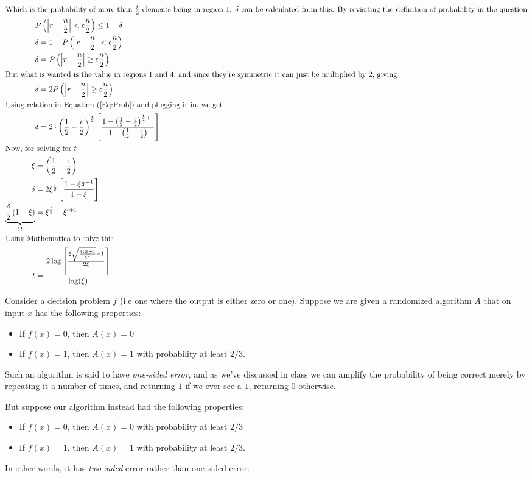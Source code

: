 \documentclass[addpoints]{exam}
\renewcommand{\P}[1]{\left( #1\right)}
\newcommand{\abs}[1]{\left| #1\right|}
\begin{document}
\begin{questions}
\begin{solution}
\begin{align}
\intertext{Which is the probability of more than $\frac{t}{2}$ elements being in region 1. $\delta$ can be calculated from this. By revisiting the definition of probability in the question}
&P\P{\abs{r-\frac{n}{2}} < \epsilon\frac{n}{2}} \leq 1-\delta\\
&\delta = 1 - P\P{\abs{r-\frac{n}{2}} < \epsilon\frac{n}{2}}\\
&\delta = P\P{\abs{r-\frac{n}{2}} \geq \epsilon\frac{n}{2}}\\
\intertext{But what is wanted is the value in regions 1 and 4, and since they're symmetric it can just be multiplied by 2, giving}
&\delta = 2P\P{\abs{r-\frac{n}{2}} \geq \epsilon\frac{n}{2}}\\
\intertext{Using relation in Equation (\ref{Eq:Prob}) and plugging it in, we get}
&\delta = 2\cdot \P{\frac{1}{2}-\frac{\epsilon}{2}}^{\frac{t}{2}} \left[\frac{1-\P{\frac{1}{2}-\frac{\epsilon}{2}}^{\frac{t}{2}+1}}{1-\P{\frac{1}{2}-\frac{\epsilon}{2}}}\right]\\
\intertext{Now, for solving for $t$}
\xi &= \P{\frac{1}{2}-\frac{\epsilon}{2}}\\
\delta &= 2\xi^{\frac{t}{2}}\left[ \frac{1-\xi^{\frac{t}{2}+1}}{1-\xi}\right]\\
\underbrace{\frac{\delta}{2}\P{1-\xi}}_{\Omega} &= \xi^{\frac{t}{2}}-\xi^{t+1}\\
\intertext{Using Mathematica to solve this}
t &= \frac{2\log\left[\frac{\xi\sqrt{\frac{4\Omega\xi+1}{\xi^{2}}}-1}{2\xi}\right]}{\log(\xi)}
\end{align}
\end{solution}



  Consider a decision problem $f$ (i.e one where the output is either zero or
  one). Suppose we are given a randomized algorithm $A$ that on input $x$ has
  the following properties:
  \begin{itemize}
  \item If $f(x) = 0$, then $A(x) = 0$
  \item If $f(x) = 1$, then $A(x) = 1$ with probability at least $2/3$.
  \end{itemize}
  Such an algorithm is said to have \emph{one-sided error}, and as we've
  discussed in class we can amplify the probability of being correct merely by
  repeating it a number of times, and returning $1$ if we ever see a $1$,
  returning $0$ otherwise.

  But suppose our algorithm instead had the following properties:
  \begin{itemize}
  \item If $f(x) = 0$, then $A(x) = 0$ with probability at least $2/3$
  \item If $f(x) = 1$, then $A(x) = 1$ with probability at least $2/3$.
  \end{itemize}
  In other words, it has \emph{two-sided} error rather than one-sided error.
  \begin{parts}

\end{parts}
\end{questions}
\end{document}

